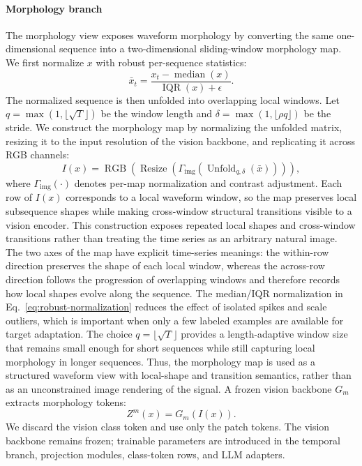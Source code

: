 \documentclass[10pt,journal,compsoc]{IEEEtran}
\begin{document}
\paragraph{Morphology branch}
The morphology view exposes waveform morphology by converting the same one-dimensional sequence into a two-dimensional sliding-window morphology map.
We first normalize $x$ with robust per-sequence statistics:
\begin{equation}
\label{eq:robust-normalization}
\bar{x}_t
=
\frac{x_t-\operatorname{median}(x)}
{\operatorname{IQR}(x)+\epsilon}.
\end{equation}
The normalized sequence is then unfolded into overlapping local windows.
Let $q=\max(1,\lfloor\sqrt{T}\rfloor)$ be the window length and
$\delta=\max(1,\lfloor\rho q\rfloor)$ be the stride.
We construct the morphology map by normalizing the unfolded matrix, resizing it to the input resolution of the vision backbone, and replicating it across RGB channels:
\begin{equation}
\label{eq:morphology-map}
I(x)
=
\operatorname{RGB}
\left(
\operatorname{Resize}
\left(
\Gamma_{\mathrm{img}}
\left(
\operatorname{Unfold}_{q,\delta}(\bar{x})
\right)
\right)
\right),
\end{equation}
where $\Gamma_{\mathrm{img}}(\cdot)$ denotes per-map normalization and contrast adjustment.
Each row of $I(x)$ corresponds to a local waveform window, so the map preserves local subsequence shapes while making cross-window structural transitions visible to a vision encoder.
This construction exposes repeated local shapes and cross-window transitions rather than treating the time series as an arbitrary natural image.
The two axes of the map have explicit time-series meanings: the within-row direction preserves the shape of each local window, whereas the across-row direction follows the progression of overlapping windows and therefore records how local shapes evolve along the sequence.
The median/IQR normalization in Eq.~\eqref{eq:robust-normalization} reduces the effect of isolated spikes and scale outliers, which is important when only a few labeled examples are available for target adaptation.
The choice $q=\lfloor\sqrt{T}\rfloor$ provides a length-adaptive window size that remains small enough for short sequences while still capturing local morphology in longer sequences.
Thus, the morphology map is used as a structured waveform view with local-shape and transition semantics, rather than as an unconstrained image rendering of the signal.
A frozen vision backbone $G_m$ extracts morphology tokens:
\begin{equation}
\label{eq:morphology-encoder}
Z^{m}(x)=G_m(I(x)).
\end{equation}
We discard the vision class token and use only the patch tokens.
The vision backbone remains frozen; trainable parameters are introduced in the temporal branch, projection modules, class-token rows, and LLM adapters.
\end{document}
